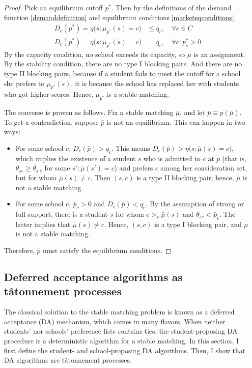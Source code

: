 \documentclass[12pt]{article}
\theoremstyle{definition}
\begin{document}
\begin{proof}Pick an equilibrium cutoff $p^*$. Then by the definitions of the demand function \eqref{demanddefinition} and equilibrium conditions \eqref{marketeqconditions}, 
\begin{align*}
D_c(p^*) = \eta\bigl(s: \mu_{p^*}(s) = c\bigr) &\leq q_c, \quad\forall c \in C \\
D_c(p^*) = \eta\bigl(s: \mu_{p^*}(s) = c\bigr) &= q_c, \quad \forall c: p_c^* > 0 
\end{align*}
By the capacity condition, no school exceeds its capacity, so $\mu$ is an assignment. By the stability condition, there are no type I blocking pairs. And there are no type II blocking pairs, because if a student fails to meet the cutoff for a school she prefers to $\mu_{p^*}(s)$, it is because the school has replaced her with students who got higher scores. Hence, $\mu_{p^*}$ is a stable matching.

The converse is proven as follows. Fix a stable matching $\bar \mu$, and let $\bar p \equiv p(\bar \mu)$. To get a contradiction, suppose $\bar p$ is not an equilibrium. This can happen in two ways:
\begin{itemize}
\item For some school $c$, $D_c( \bar p) > q_c$. This means $D_c( \bar p)  >  \eta\bigl(s: \bar \mu(s) = c\bigr) $, which implies the existence of a student $s$ who is admitted to $c$ at $\bar p$ (that is, $\theta_{sc} \geq \theta_{s'c}$ for some $s': \bar \mu(s') = c$) and prefers $c$ among her consideration set, but for whom $\bar \mu(s) \neq c$. Then $(s, c)$ is a type II blocking pair; hence, $\bar \mu$ is not a stable matching.
\item For some school $c$, $\bar p_c > 0$ and $D_c(\bar p) < q_c$. By the assumption of strong or full support, there is a student $s$ for whom $c >_s \bar \mu(s)$ and $\theta_{sc} < \bar p_c$. The latter implies that $\bar \mu(s) \neq c$. Hence, $(s, c)$ is a type I blocking pair, and $\mu$ is not a stable matching. 
\end{itemize}
Therefore, $\bar p$ must satisfy the equilibrium conditions.
\end{proof}

\subsection{Deferred acceptance algorithms as t\^{atonnement} processes} \label{defaccaretat}
The classical solution to the stable matching problem is known as a deferred acceptance (DA) mechanism, which comes in many flavors. When neither students' nor schools' preference lists contains ties, the student-proposing DA procedure is a deterministic algorithm for a stable matching.  In this section, I first define the student- and school-proposing DA algorithms. Then, I show that DA algorithms are t\^{a}tonnement processes.
\end{document}
